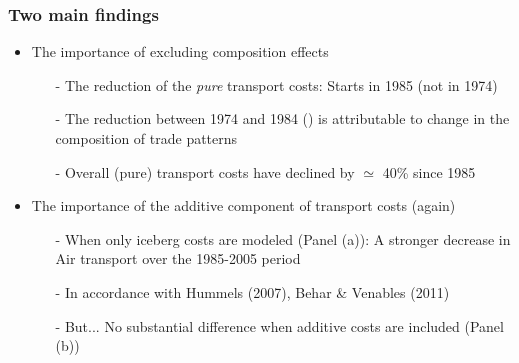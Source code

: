 \documentclass[10 pt,Helvetica, french]{beamer}
\begin{document}
\begin{frame}[label=slide_comment_compositioneffects]
\frametitle{Two main findings}
\begin{itemize}
\item The importance of excluding composition effects  \vspace{0.1cm}
\begin{itemize}
\item[-] The reduction of the \textit{pure} transport costs: Starts in 1985 (not in 1974) \vspace{0.1cm}
\item[-] The reduction between 1974 and 1984 (\hyperlink{slide_fig1}{}) is attributable to change in the composition of trade patterns \vspace{0.1cm}
\item[-] Overall (pure) transport costs have declined by $\simeq$ 40\% since 1985\vspace{0.1cm}
\end{itemize}
\item The importance of the additive component of transport costs (again) \vspace{0.1cm}
\begin{itemize}
\item[-] When only iceberg costs are modeled (Panel (a)): A stronger decrease in Air transport over the 1985-2005 period \vspace{0.1cm}
\item[-] In accordance with Hummels (2007), Behar \& Venables (2011) \vspace{0.1cm}
\item[-] But... No substantial difference when additive costs are included (Panel (b))
\end{itemize}
\end{itemize}
\end{frame}
\end{document}
